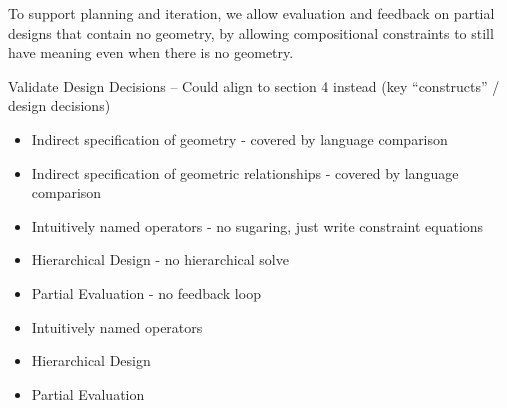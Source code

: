 {To support planning and iteration, we allow evaluation and feedback on partial designs that contain no geometry, by allowing compositional constraints to still have meaning even when there is no geometry.    


Validate Design Decisions -- Could align to section 4 instead (key ``constructs'' / design decisions)
\begin{itemize}
    \item Indirect specification of geometry - covered by language comparison
    \item Indirect specification of geometric relationships - covered by language comparison
    \item Intuitively named operators - no sugaring, just write constraint equations
    \item Hierarchical Design - no hierarchical solve
    \item Partial Evaluation - no feedback loop
\end{itemize}


\begin{itemize}
    \item Intuitively named operators
    \item Hierarchical Design
    
    \item Partial Evaluation
\end{itemize}
}




